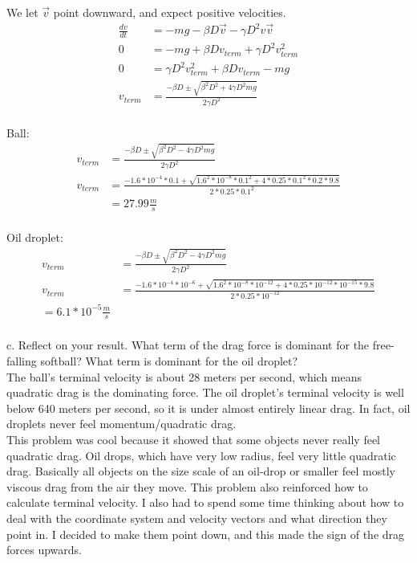 \documentclass[10pt]{article} %
\begin{document}
We let $\vec{v}$ point downward, and expect positive velocities.\\

\begin{align}
  \frac{dv}{dt} &= -mg −\beta D\vec{v} −\gamma D^2v\vec{v}\\
  0 &= -mg + \beta Dv_{term} +\gamma D^2v^2_{term}\\
  0 &= \gamma D^2v^2_{term} + \beta Dv_{term} - mg\\
  v_{term} &= \frac{-\beta D \pm \sqrt{\beta^2 D^2 + 4\gamma D^2mg}}{2\gamma D^2}\\
\end{align}

Ball:
\begin{align}
  v_{term} &= \frac{-\beta D \pm \sqrt{\beta^2 D^2 - 4\gamma D^2mg}}{2\gamma D^2}\\
  v_{term} &= \frac{-1.6*10^{-4}*0.1 + \sqrt{1.6^2*10^{-8}*0.1^2 + 4*0.25*0.1^2*0.2*9.8}}{2*0.25*0.1^2}\\
  &= 27.99 \frac{m}{s}\\
\end{align}

Oil droplet:
\begin{align}
  v_{term} &= \frac{-\beta D \pm \sqrt{\beta^2 D^2 - 4\gamma D^2mg}}{2\gamma D^2}\\
  v_{term} &= \frac{-1.6*10^{-4}*10^{-6} + \sqrt{1.6^2*10^{-8}*10^{-12} + 4*0.25*10^{-12}*10^{-15}*9.8}}{2*0.25*10^{-12}}\\
  = 6.1*10^{-5} \frac{m}{s}\\
\end{align}

c. Reflect on your result. What term of the drag force is dominant  for the  free-falling softball? What term is dominant for the oil droplet?\\

The ball's terminal velocity is about 28 meters per second, which means quadratic drag is the dominating force. The oil droplet's terminal velocity is well below 640 meters per second, so it is under almost entirely linear drag. In fact, oil droplets never feel momentum/quadratic drag.\\

This problem was cool because it showed that some objects never really feel quadratic drag. Oil drops, which have very low radius, feel very little quadratic drag. Basically all objects on the size scale of an oil-drop or smaller feel mostly viscous drag from the air they move. This problem also reinforced how to calculate terminal velocity. I also had to spend some time thinking about how to deal with the coordinate system and velocity vectors and what direction they point in. I decided to make them point down, and this made the sign of the drag forces upwards. \\
\end{document}
